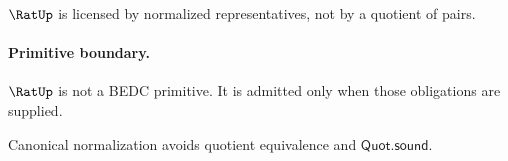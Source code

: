 \begin{corollary}\label{cor:rat-licensed-not-primitive}
\(\RatUp\) is licensed by normalized representatives, not by a quotient of pairs.
\end{corollary}

\paragraph{Primitive boundary.}
\(\RatUp\) is not a BEDC primitive. It is admitted only when those obligations are supplied.

\begin{remark}
\label{rem:rat-zero-axiom-note}
Canonical normalization avoids quotient equivalence and \(\mathsf{Quot.sound}\).
\end{remark}
